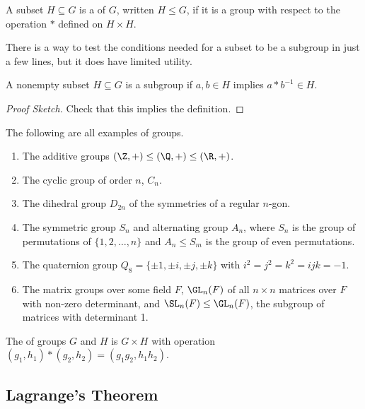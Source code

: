 \begin{definition}[Subgroup]
	A subset $H \subseteq G$ is a  of $G$, written $H \leq G$, if it is a group with respect to the operation $*$ defined on $H \times H$.
\end{definition}

There is a way to test the conditions needed for a subset to be a subgroup in just a few lines, but it does have limited utility.

\begin{lemma}
A nonempty subset $H \subseteq G$ is a subgroup if $a, b \in H$ implies $a * b^{-1} \in H$.
\end{lemma}
\begin{proof}[Proof Sketch]
	Check that this implies the definition.
\end{proof}

\begin{example}
	The following are all examples of groups.
	\begin{enumerate}[label=(\roman*)]
		\item The additive groups $(\Z, +) \leq (\Q, +) \leq (\R, +)$.
		\item The cyclic group of order $n$, $C_n$.
		\item The dihedral group $D_{2n}$ of the symmetries of a regular $n$-gon.
		\item The symmetric group $S_n$ and alternating group $A_n$, where $S_n$ is the group of permutations of $\{1, 2, \dots, n\}$ and $A_n \leq S_m$ is the group of even permutations. 
		\item The quaternion group $Q_8 = \{\pm 1, \pm i, \pm j, \pm k \}$ with $i^2 = j^2 = k^2 = ijk = -1$.
		\item The matrix groups over some field $F$, $\GL_n(F)$ of all $n \times n$ matrices over $F$ with non-zero determinant, and $\SL_n(F) \leq \GL_n(F)$, the subgroup of matrices with determinant 1.
	\end{enumerate}
\end{example}

\begin{definition}
	The  of groups $G$ and $H$ is $G \times H$ with operation $(g_1, h_1) * (g_2, h_2) = (g_1 g_2, h_1 h_2)$. 
\end{definition}

\subsection{Lagrange's Theorem}


